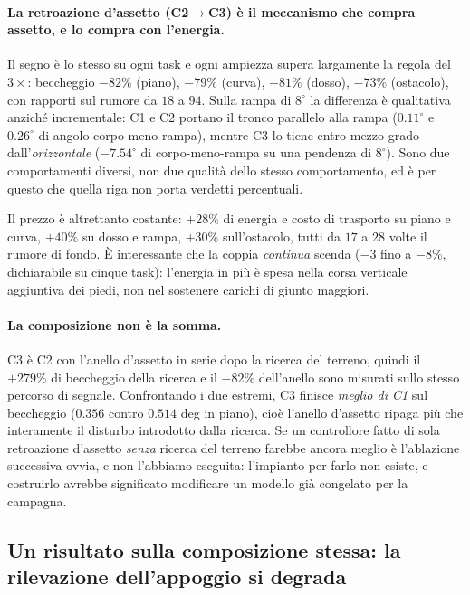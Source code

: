 \documentclass[11pt,a4paper]{article}
\newcommand{\Co}{\textsf{C1}}
\newcommand{\Ct}{\textsf{C2}}
\newcommand{\Cth}{\textsf{C3}}
\begin{document}
\paragraph{La retroazione d'assetto (\Ct$\rightarrow$\Cth) \`e il meccanismo che
compra assetto, e lo compra con l'energia.} Il segno \`e lo stesso su ogni task
e ogni ampiezza supera largamente la regola del $3\times$: beccheggio $-82\%$
(piano), $-79\%$ (curva), $-81\%$ (dosso), $-73\%$ (ostacolo), con rapporti sul
rumore da $18$ a $94$. Sulla rampa di $8^\circ$ la differenza \`e qualitativa
anzich\'e incrementale: \Co{} e \Ct{} portano il tronco parallelo alla rampa
($0.11^\circ$ e $0.26^\circ$ di angolo corpo-meno-rampa), mentre \Cth{} lo
tiene entro mezzo grado dall'\emph{orizzontale} ($-7.54^\circ$ di
corpo-meno-rampa su una pendenza di $8^\circ$). Sono due comportamenti diversi,
non due qualit\`a dello stesso comportamento, ed \`e per questo che quella riga
non porta verdetti percentuali.

Il prezzo \`e altrettanto costante: $+28\%$ di energia e costo di trasporto su
piano e curva, $+40\%$ su dosso e rampa, $+30\%$ sull'ostacolo, tutti da $17$ a
$28$ volte il rumore di fondo. \`E interessante che la coppia \emph{continua}
scenda ($-3$ fino a $-8\%$, dichiarabile su cinque task): l'energia in pi\`u \`e
spesa nella corsa verticale aggiuntiva dei piedi, non nel sostenere carichi di
giunto maggiori.

\paragraph{La composizione non \`e la somma.} \Cth{} \`e \Ct{} con l'anello
d'assetto in serie dopo la ricerca del terreno, quindi il $+279\%$ di
beccheggio della ricerca e il $-82\%$ dell'anello sono misurati sullo stesso
percorso di segnale. Confrontando i due estremi, \Cth{} finisce \emph{meglio di
\Co} sul beccheggio ($0.356$ contro $0.514$ deg in piano), cio\`e l'anello
d'assetto ripaga pi\`u che interamente il disturbo introdotto dalla ricerca. Se
un controllore fatto di sola retroazione d'assetto \emph{senza} ricerca del
terreno farebbe ancora meglio \`e l'ablazione successiva ovvia, e non l'abbiamo
eseguita: l'impianto per farlo non esiste, e costruirlo avrebbe significato
modificare un modello gi\`a congelato per la campagna.

\subsection{Un risultato sulla composizione stessa: la rilevazione
dell'appoggio si degrada}
\end{document}
